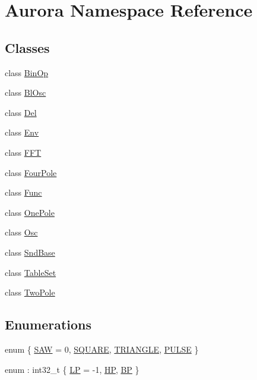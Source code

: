 \hypertarget{namespace_aurora}{}\section{Aurora Namespace Reference}
\label{namespace_aurora}
\subsection*{Classes}
\begin{DoxyCompactItemize}
\item 
class \hyperlink{class_aurora_1_1_bin_op}{Bin\+Op}
\item 
class \hyperlink{class_aurora_1_1_bl_osc}{Bl\+Osc}
\item 
class \hyperlink{class_aurora_1_1_del}{Del}
\item 
class \hyperlink{class_aurora_1_1_env}{Env}
\item 
class \hyperlink{class_aurora_1_1_f_f_t}{F\+FT}
\item 
class \hyperlink{class_aurora_1_1_four_pole}{Four\+Pole}
\item 
class \hyperlink{class_aurora_1_1_func}{Func}
\item 
class \hyperlink{class_aurora_1_1_one_pole}{One\+Pole}
\item 
class \hyperlink{class_aurora_1_1_osc}{Osc}
\item 
class \hyperlink{class_aurora_1_1_snd_base}{Snd\+Base}
\item 
class \hyperlink{class_aurora_1_1_table_set}{Table\+Set}
\item 
class \hyperlink{class_aurora_1_1_two_pole}{Two\+Pole}
\end{DoxyCompactItemize}
\subsection*{Enumerations}
\begin{DoxyCompactItemize}
\item 
enum \{ \hyperlink{namespace_aurora_a890b8d3786c8a25750e8097adae3b513ad47a607309b6d737bba699a295e5e814}{S\+AW} = 0, 
\hyperlink{namespace_aurora_a890b8d3786c8a25750e8097adae3b513ad12f117b00f964cb4de3809ca2e2fa2b}{S\+Q\+U\+A\+RE}, 
\hyperlink{namespace_aurora_a890b8d3786c8a25750e8097adae3b513a0c9e1e4fb03cbc79bb5fdd9db743818f}{T\+R\+I\+A\+N\+G\+LE}, 
\hyperlink{namespace_aurora_a890b8d3786c8a25750e8097adae3b513aa52ebfb9f31c0d7f0da3f2f66b622928}{P\+U\+L\+SE}
 \}
\item 
enum \+: int32\+\_\+t \{ \hyperlink{namespace_aurora_a963f359f40fdbc5f4dbe4043534de9ebaa9f81f17c7244e2198dba962e817cf89}{LP} = -\/1, 
\hyperlink{namespace_aurora_a963f359f40fdbc5f4dbe4043534de9eba404a7e9d666dc8dc6a9492163a8f3d49}{HP}, 
\hyperlink{namespace_aurora_a963f359f40fdbc5f4dbe4043534de9ebae818fb1792095c52b12163ec152896c8}{BP}
 \}
\end{DoxyCompactItemize}
